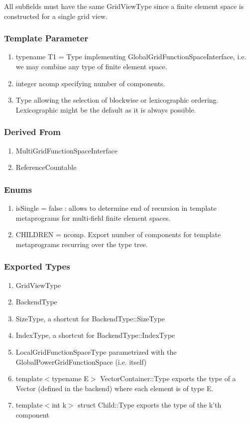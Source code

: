 \documentclass[11pt,a4paper,DIV11,%
notitlepage,oneside,abstracton,%
bibtotoc]{scrartcl}
\begin{document}
All subfields must have the same GridViewType since a finite element
space is constructed for a single grid view.

\subsubsection{Template Parameter}

\begin{enumerate}[1)]
\item typename T1 = Type implementing GlobalGridFunctionSpaceInterface, i.e. we may combine any type
  of finite element space.
\item integer ncomp specifying number of components.
\item Type allowing the selection of blockwise or lexicographic
  ordering. Lexicographic might be the default as it is always possible.
\end{enumerate}

\subsubsection{Derived From}

\begin{enumerate}[1)]
\item MultiGridFunctionSpaceInterface
\item ReferenceCountable
\end{enumerate}

\subsubsection{Enums}

\begin{enumerate}[1)]
\item isSingle = false : allows to determine end of recursion in
  template metaprograms for multi-field finite element spaces.
\item CHILDREN = ncomp. Export number of components for template
  metaprograms recurring over the type tree.
\end{enumerate}

\subsubsection{Exported Types}

\begin{enumerate}[1)]
\item GridViewType 
\item BackendType
\item SizeType, a shortcut for BackendType::SizeType
\item IndexType, a shortcut for BackendType::IndexType
\item LocalGridFunctionSpaceType parametrized with the GlobalPowerGridFunctionSpace (i.e. itself)
\item template$<$typename E$>$ VectorContainer::Type exports the type of a Vector
  (defined in the backend) where each element is of type E.
\item template$<$int k$>$ struct Child::Type exports the type of
  the k'th component
\end{enumerate}
\end{document}
